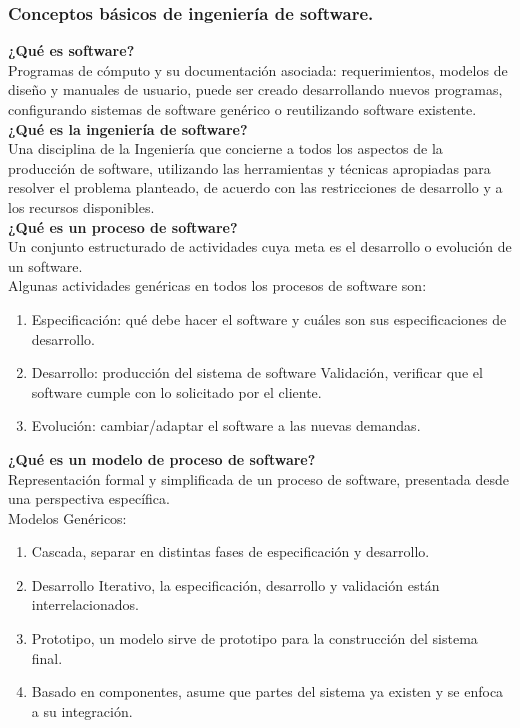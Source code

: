 \documentclass[12pt,twoside]{article}
\begin{document}
\subsubsection{Conceptos b\'asicos de ingenier\'ia de software.}
\textbf{¿Qu\'e es software?}\\
Programas de c\'omputo y su documentaci\'on asociada: requerimientos, modelos de diseño y 
manuales de usuario, puede ser creado desarrollando nuevos programas, configurando 
sistemas de software genérico o reutilizando software existente.\\
\textbf{¿Qu\'e es la ingenier\'ia de software?}\\
Una disciplina de la Ingeniería que concierne a todos los aspectos de la producción de 
software, utilizando las herramientas y técnicas apropiadas para resolver el problema 
planteado, de acuerdo con las restricciones de desarrollo y a los recursos disponibles.\\
\textbf{¿Qu\'e es un proceso de software?}\\
Un conjunto estructurado de actividades cuya meta es el desarrollo o evolución de un 
software.\\
Algunas actividades genéricas en todos los procesos de software son:
\begin{enumerate}
    \item Especificación: qué debe hacer el software y cuáles son sus especificaciones 
    de desarrollo.
    \item Desarrollo: producción del sistema de software Validación, verificar que el 
    software cumple con lo solicitado por el cliente.
    \item Evolución: cambiar/adaptar el software a las nuevas demandas.
\end{enumerate}
\textbf{¿Qué es un modelo de proceso de software?}\\
Representación formal y simplificada de un proceso de software, presentada desde una 
perspectiva específica.\\
Modelos Genéricos:
\begin{enumerate}
    \item Cascada, separar en distintas fases de especificación y desarrollo.
    \item Desarrollo Iterativo, la especificación, desarrollo y validación están 
    interrelacionados.
    \item Prototipo, un modelo sirve de prototipo para la construcción del sistema final.
    \item Basado en componentes, asume que partes del sistema ya existen y se enfoca a su 
    integración.
\end{enumerate}
\end{document}
